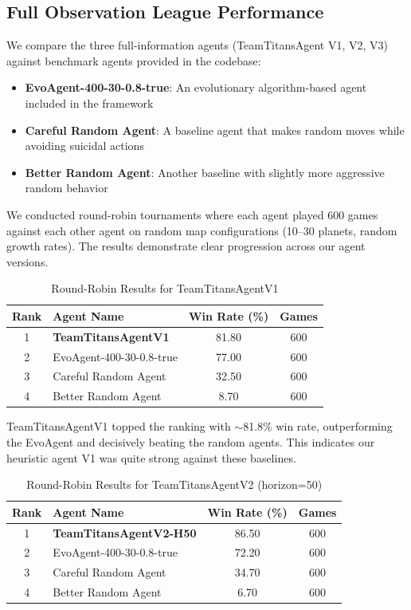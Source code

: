 \documentclass[conference]{IEEEtran}
\begin{document}
\subsection{Full Observation League Performance}

We compare the three full-information agents (TeamTitansAgent V1, V2, V3) against benchmark agents provided in the codebase:
\begin{itemize}
\item \textbf{EvoAgent-400-30-0.8-true}: An evolutionary algorithm-based agent included in the framework
\item \textbf{Careful Random Agent}: A baseline agent that makes random moves while avoiding suicidal actions
\item \textbf{Better Random Agent}: Another baseline with slightly more aggressive random behavior
\end{itemize}

We conducted round-robin tournaments where each agent played 600 games against each other agent on random map configurations (10--30 planets, random growth rates). The results demonstrate clear progression across our agent versions.

\begin{table}[htbp]
\caption{Round-Robin Results for TeamTitansAgentV1}
\begin{center}
\begin{tabular}{|c|l|c|c|}
\hline
\textbf{Rank} & \textbf{Agent Name} & \textbf{Win Rate (\%)} & \textbf{Games} \\
\hline
1 & \textbf{TeamTitansAgentV1} & 81.80 & 600 \\
2 & EvoAgent-400-30-0.8-true & 77.00 & 600 \\
3 & Careful Random Agent & 32.50 & 600 \\
4 & Better Random Agent & 8.70 & 600 \\
\hline
\end{tabular}
\label{tab:v1_results}
\end{center}
\end{table}

TeamTitansAgentV1 topped the ranking with $\sim$81.8\% win rate, outperforming the EvoAgent and decisively beating the random agents. This indicates our heuristic agent V1 was quite strong against these baselines.

\begin{table}[htbp]
\caption{Round-Robin Results for TeamTitansAgentV2 (horizon=50)}
\begin{center}
\begin{tabular}{|c|l|c|c|}
\hline
\textbf{Rank} & \textbf{Agent Name} & \textbf{Win Rate (\%)} & \textbf{Games} \\
\hline
1 & \textbf{TeamTitansAgentV2-H50} & 86.50 & 600 \\
2 & EvoAgent-400-30-0.8-true & 72.20 & 600 \\
3 & Careful Random Agent & 34.70 & 600 \\
4 & Better Random Agent & 6.70 & 600 \\
\hline
\end{tabular}
\label{tab:v2_results}
\end{center}
\end{table}
\end{document}
